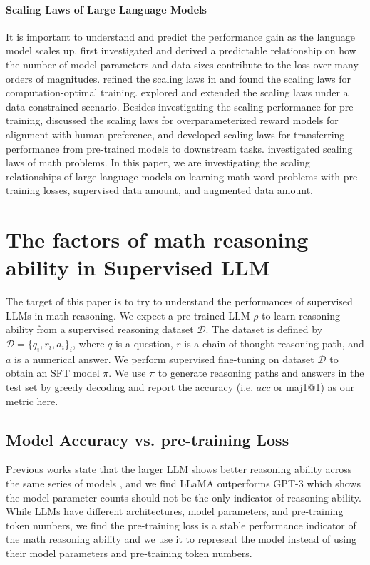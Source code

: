 \paragraph{Scaling Laws of Large Language Models} It is important to understand and predict the performance gain as the language model scales up. \citet{scalinglaw} first investigated and derived a predictable relationship on how the number of model parameters and data sizes contribute to the loss over many orders of magnitudes. \citet{chinchilla} refined the scaling laws in \citep{scalinglaw} and found the scaling laws for computation-optimal training. \citet{muennighoff2023scaling} explored and extended the scaling laws under a data-constrained scenario. Besides investigating the scaling performance for pre-training, \citet{gao2022rmscaling} discussed the scaling laws for overparameterized reward models for alignment with human preference, and \citet{hernandez2021transferscaling} developed scaling laws for transferring performance from pre-trained models to downstream tasks. \cite{henighan2020scaling,caballero2022broken} investigated scaling laws of math problems. In this paper, we are investigating the scaling relationships of large language models on learning math word problems with pre-training losses, supervised data amount, and augmented data amount.

\section{The factors of math reasoning ability in Supervised LLM}

The target of this paper is to try to understand the performances of supervised LLMs in math reasoning. We expect a pre-trained LLM $\rho$ to learn reasoning ability from a supervised reasoning dataset $\mathcal{D}$.
The dataset is defined by $\mathcal{D}=\{q_i,r_i,a_i\}_i$, where $q$ is a question, $r$ is a chain-of-thought reasoning path, and $a$ is a numerical answer. We perform supervised fine-tuning on dataset $\mathcal{D}$ to obtain an SFT model $\pi$.
We use $\pi$ to generate reasoning paths and answers in the test set by greedy decoding and report the accuracy (i.e. $acc$ or maj1@1) as our metric here.

\subsection{Model Accuracy vs. pre-training Loss} Previous works state that the larger LLM shows better reasoning ability across the same series of models \citep{gpt3,chowdhery2022palm,llama,llama2}, and we find LLaMA outperforms GPT-3 which shows the model parameter counts should not be the only indicator of reasoning ability. While LLMs have different architectures, model parameters, and pre-training token numbers, we find the pre-training loss is a stable performance indicator of the math reasoning ability and we use it to represent the model instead of using their model parameters and pre-training token numbers.


